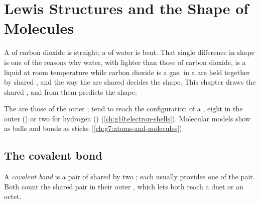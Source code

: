 \chapter{Lewis Structures and the Shape of Molecules}\label{ch:g10:lewis-and-shape}

A  of carbon dioxide is straight; a  of water is bent.
That single difference in shape is one of the reasons why water, with
 lighter than those of carbon dioxide, is a liquid at room
temperature while carbon dioxide is a gas.  in a  are held
together by shared , and the way the  are shared
decides the shape. This chapter draws the shared , and from
them predicts the shape.

\begin{recall}
The  are those of the outer ;  tend to reach
the configuration of a , eight  in the outer 
() or two for hydrogen ()
(\cref{ch:g10:electron-shells}). Molecular models show  as balls and
bonds as sticks (\cref{ch:g7:atoms-and-molecules}).
\end{recall}

\section{The covalent bond}

\begin{definition}\label{def:g10:lewis-and-shape:covalent-bond}
A \emph{covalent bond} is a pair of  shared
by two ; each  usually provides one  of the pair. Both
 count the shared pair in their outer , which lets both reach
a duet or an octet.
\end{definition}

